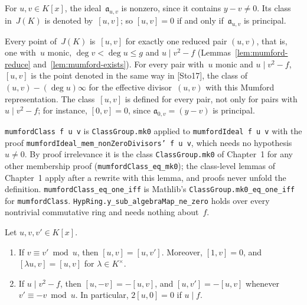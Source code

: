 \begin{definition}
\label{def:hv-class}
\leanok
{}
For $u, v \in K[x]$, the ideal~$\mathfrak a_{u,v}$ is nonzero, since it contains $y - v \ne 0$.
Its class in~$J(K)$ is denoted by~$[u, v]$; so $[u, v] = 0$ if and only if~$\mathfrak a_{u,v}$ is
principal.
\end{definition}

Every point of~$J(K)$ is~$[u, v]$ for exactly one reduced pair $(u, v)$, that is, one with~$u$
monic, $\deg v < \deg u \le g$ and $u \mid v^2 - f$ (Lemmas~\ref{lem:mumford-reduce}
and~\ref{lem:mumford-exists}). For every pair with~$u$ monic and $u \mid v^2 - f$, $[u, v]$ is the
point denoted in the same way in [Sto17], the class of $(u, v) - (\deg u)\infty$ for the effective
divisor~$(u, v)$ with this Mumford representation. The class~$[u, v]$ is defined for every pair,
not only for pairs with $u \mid v^2 - f$; for instance, $[0, v] = 0$, since
$\mathfrak a_{0,v} = (y - v)$ is principal.

\begin{remark}[Formalization]
\texttt{mumfordClass f u v} is \texttt{ClassGroup.mk0} applied to \texttt{mumfordIdeal f u v} with
the proof \texttt{mumfordIdeal\_mem\_nonZeroDivisors' f u v}, which needs no hypothesis $u \ne 0$.
By proof irrelevance it is the class \texttt{ClassGroup.mk0} of Chapter~1 for any other membership
proof (\texttt{mumfordClass\_eq\_mk0}); the class-level lemmas of Chapter~1 apply after a rewrite
with this lemma, and proofs never unfold the definition. \texttt{mumfordClass\_eq\_one\_iff} is
Mathlib's \texttt{ClassGroup.mk0\_eq\_one\_iff} for \texttt{mumfordClass}.
\texttt{HypRing.y\_sub\_algebraMap\_ne\_zero} holds over every nontrivial commutative ring and needs
nothing about~$f$.
\end{remark}

\begin{lemma}
\label{lem:hv-class-basic}
\leanok
{}
Let $u, v, v' \in K[x]$.
\begin{enumerate}
  \item If $v \equiv v' \bmod u$, then $[u, v] = [u, v']$. Moreover, $[1, v] = 0$, and
    $[\lambda u, v] = [u, v]$ for $\lambda \in K^\times$.
  \item If $u \mid v^2 - f$, then $[u, -v] = -[u, v]$, and $[u, v'] = -[u, v]$ whenever
    $v' \equiv -v \bmod u$. In particular, $2[u, 0] = 0$ if $u \mid f$.
\end{enumerate}
\end{lemma}

